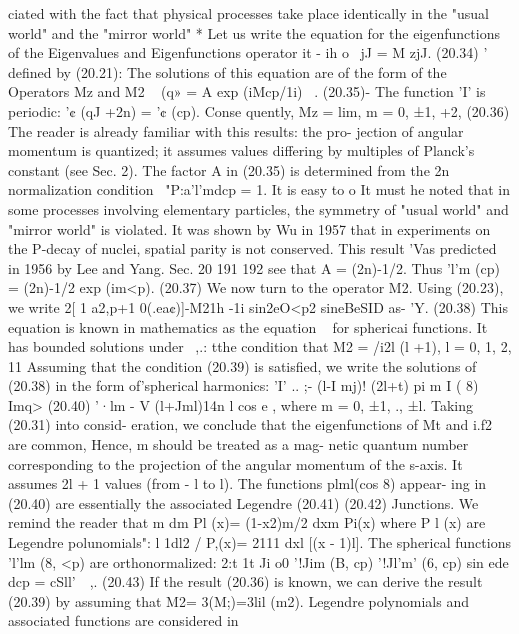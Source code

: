 \documentclass[a4paper,sfsidenotes,colorlinks=true]{tufte-book}
\numberwithin{equation}{section}
\numberwithin{figure}{section}
\begin{document}
{{    ciated with the fact that physical processes take place
    identically in the "usual world" and the "mirror world" * Let us
    write the equation for the eigenfunctions of the Eigenvalues and
    Eigenfunctions operator it - ih o~ jJ = M zjJ. (20.34) ' defined
    by (20.21): The solutions of this equation are of the form of the
    Operators Mz and M2 ~ (q» = A exp (iMcp/1i)~ . (20.35)- The
    function 'I' is periodic: '¢ (qJ +2n) = '¢ (cp). Conse quently, Mz
    = lim, m = 0, ±1, +2, (20.36) The reader is already familiar with
    this results: the pro- jection of angular momentum is quantized;
    it assumes values differing by multiples of Planck's constant (see
    Sec. 2). The factor A in (20.35) is determined from the 2n
    normalization condition ~"P:a'l'mdcp = 1. It is easy to o It must
    he noted that in some processes involving elementary particles,
    the symmetry of "usual world" and "mirror world" is violated. It
    was shown by Wu in 1957 that in experiments on the P-decay of
    nuclei, spatial parity is not conserved. This result 'Vas
    predicted in 1956 by Lee and Yang.  Sec. 20 191 192 see that A =
    (2n)-1/2. Thus 'l'm (cp) = (2n)-1/2 exp (im<p). (20.37) We now
    turn to the operator M2. Using (20.23), we write 2[ 1 a2,p+1
    0(.ea¢)]-M21h -1i sin2eO<p2 sineBeSID as- 'Y.  (20.38) This
    equation is known in mathematics as the equation ~ for sphericai
    functions. It has bounded solutions under ~,.: tthe condition that
    M2 = /i2l (l +1), l = 0, 1, 2, 11 Assuming that the condition
    (20.39) is satisfied, we write the solutions of (20.38) in the
    form of'spherical harmonics: 'I' .. ;- (l-I mj)! (2l+t) pi m I (
    8) Imq> (20.40) '·lm - V (l+Jml)14n l cos e , where m = 0, ±1, .,
    ±l. Taking (20.31) into consid- eration, we conclude that the
    eigenfunctions of Mt and i.f2 are common, Hence, m should be
    treated as a mag- netic quantum number corresponding to the
    projection of the angular momentum of the s-axis. It assumes 2l +
    1 values (from - l to l). The functions plml(cos 8) appear- ing in
    (20.40) are essentially the associated Legendre (20.41) (20.42)
    Junctions. We remind the reader that m dm Pl (x)= (1-x2)m/2 dxm
    Pi(x) where P l (x) are Legendre polunomials": l 1dl2 / P,(x)=
    2111 dxl [(x - 1)l].  The spherical functions 'l'lm (8, <p) are
    orthonormalized: 2:t 1t Ji o0 '!Jim (B, cp) '!Jl'm' (6, cp) sin
    ede dcp = cSll'~~,. (20.43) If the result (20.36) is known, we can
    derive the result (20.39) by assuming that M2= 3(M;)=3lil (m2).
    Legendre polynomials and associated functions are considered in
}}
\end{document}
